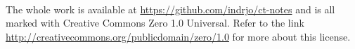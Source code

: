 

\newpage

~\vfill

\noindent The whole work is available at \url{https://github.com/indrjo/ct-notes} and is all marked with {\sc Creative Commons Zero 1.0 Universal}. Refer to the link \url{http://creativecommons.org/publicdomain/zero/1.0} for more about this license.

\cleardoublepage
